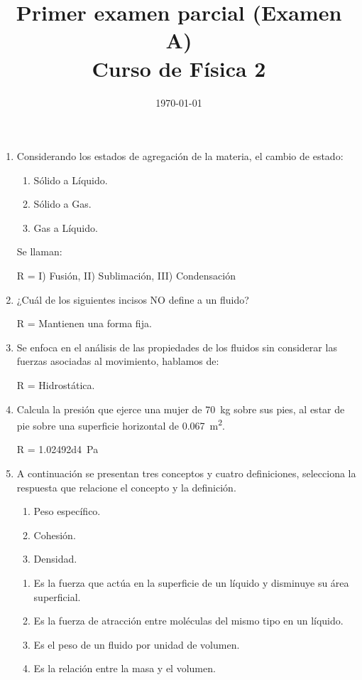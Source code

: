 \documentclass[14pt]{extarticle}
\title{\vspace*{-2cm} Primer examen parcial (Examen A)\\  Curso de Física 2\vspace{-5ex}}
\date{\today}
\begin{document}
\maketitle

\begin{enumerate}
\item Considerando los estados de agregación de la materia, el cambio de estado:
\begin{enumerate}[label=\Roman*)]
\item Sólido a Líquido.
\item Sólido a Gas.
\item Gas a Líquido.
\end{enumerate}
Se llaman:

R = I) Fusión, II) Sublimación, III) Condensación

\item ¿Cuál de los siguientes incisos NO define a un fluido?

R = Mantienen una forma fija.

\item Se enfoca en el análisis de las propiedades de los fluidos sin considerar las fuerzas asociadas al movimiento, hablamos de:

R = Hidrostática.

\item Calcula la presión que ejerce una mujer de \SI{70}{\kilo\gram} sobre sus pies, al estar de pie sobre una superficie horizontal de \SI{0.067}{\square\meter}.

R = \SI{1.02492d4}{\pascal}

\item A continuación se presentan tres conceptos y cuatro definiciones, selecciona la respuesta que relacione el concepto y la definición.
\begin{enumerate}[label=\arabic*)]
\item Peso específico.
\item Cohesión.
\item Densidad.
\end{enumerate}
\begin{enumerate}[label=\alph*)]
\item Es la fuerza que actúa en la superficie de un líquido y disminuye su área superficial.
\item Es la fuerza de atracción entre moléculas del mismo tipo en un líquido.
\item Es el peso de un fluido por unidad de volumen.
\item Es la relación entre la masa y el volumen.
\end{enumerate}


\end{enumerate}
\end{document}
